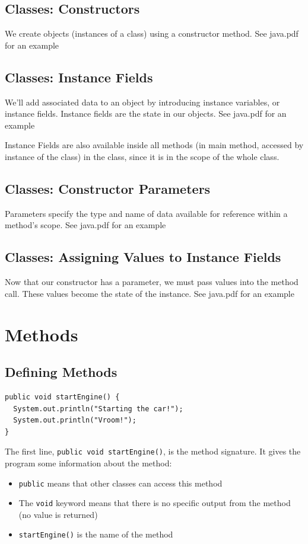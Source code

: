 \documentclass[a4paper, 12pt]{article}
\begin{document}
\subsection{Classes: Constructors}
We create objects (instances of a class) using a constructor method. See java.pdf for an example

\subsection{Classes: Instance Fields}
We'll add associated data to an object by introducing instance variables, or instance fields. Instance fields are the state in our objects. See java.pdf for an example

Instance Fields are also available inside all methods {\color{red}(in main method, accessed by instance of the class)} in the class, since it is in the scope of the whole class.

\subsection{Classes: Constructor Parameters}
Parameters specify the type and name of data available for reference within a method's scope. See java.pdf for an example

\subsection{Classes: Assigning Values to Instance Fields}
Now that our constructor has a parameter, we must pass values into the method call. These values become the state of the instance. See java.pdf for an example


\section{Methods}
\subsection{Defining Methods}
\begin{verbatim}
public void startEngine() {
  System.out.println("Starting the car!");
  System.out.println("Vroom!");
}
\end{verbatim}
The first line, \verb|public void startEngine()|, is the method signature. It gives the program some information about the method:
\begin{itemize}
\item \verb|public| means that other classes can access this method

\item The \verb|void| keyword means that there is no specific output from the method (no value is returned)

\item \verb|startEngine()| is the name of the method

\end{itemize}
\end{document}
